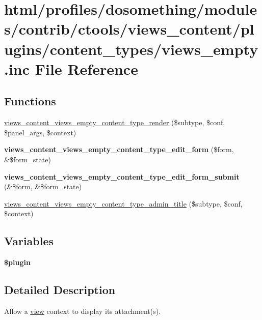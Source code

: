 \hypertarget{views__empty_8inc}{
\section{html/profiles/dosomething/modules/contrib/ctools/views\_\-content/plugins/content\_\-types/views\_\-empty.inc File Reference}
\label{views__empty_8inc}
}
\subsection*{Functions}
\begin{DoxyCompactItemize}
\item 
\hyperlink{views__empty_8inc_ae4a5f1ba3896fe55d9ffab3e59c89eeb}{views\_\-content\_\-views\_\-empty\_\-content\_\-type\_\-render} (\$subtype, \$conf, \$panel\_\-args, \$context)
\item 
\hypertarget{views__empty_8inc_ad552e0d6c56d2d369fcf5627742a7d2a}{
{\bfseries views\_\-content\_\-views\_\-empty\_\-content\_\-type\_\-edit\_\-form} (\$form, \&\$form\_\-state)}
\label{views__empty_8inc_ad552e0d6c56d2d369fcf5627742a7d2a}

\item 
\hypertarget{views__empty_8inc_a366cbf2f62cee5c72c49643cd3d574f1}{
{\bfseries views\_\-content\_\-views\_\-empty\_\-content\_\-type\_\-edit\_\-form\_\-submit} (\&\$form, \&\$form\_\-state)}
\label{views__empty_8inc_a366cbf2f62cee5c72c49643cd3d574f1}

\item 
\hyperlink{views__empty_8inc_a29ded606f108650610541efca6dda275}{views\_\-content\_\-views\_\-empty\_\-content\_\-type\_\-admin\_\-title} (\$subtype, \$conf, \$context)
\end{DoxyCompactItemize}
\subsection*{Variables}
\begin{DoxyCompactItemize}
\item 
{\bfseries \$plugin}
\end{DoxyCompactItemize}


\subsection{Detailed Description}
Allow a \hyperlink{classview}{view} context to display its attachment(s). 

